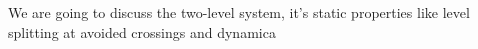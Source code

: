 We are going to discuss the two-level system, it's static properties like level splitting at avoided crossings and dynamica